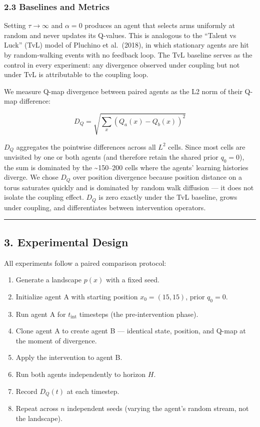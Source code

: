 \documentclass[
]{article}
\providecommand{\tightlist}{%
  \setlength{\itemsep}{0pt}\setlength{\parskip}{0pt}}
\begin{document}
\subsubsection{2.3 Baselines and Metrics}\label{baselines-and-metrics}

Setting \(\tau \to \infty\) and \(\alpha = 0\) produces an agent that
selects arms uniformly at random and never updates its Q-values. This is
analogous to the ``Talent vs Luck'' (TvL) model of Pluchino et
al.~(2018), in which stationary agents are hit by random-walking events
with no feedback loop. The TvL baseline serves as the control in every
experiment: any divergence observed under coupling but not under TvL is
attributable to the coupling loop.

We measure Q-map divergence between paired agents as the L2 norm of
their Q-map difference:

\[D_Q = \sqrt{\sum_{x} \left(Q_a(x) - Q_b(x)\right)^2}\]

\(D_Q\) aggregates the pointwise differences across all \(L^2\) cells.
Since most cells are unvisited by one or both agents (and therefore
retain the shared prior \(q_0 = 0\)), the sum is dominated by the
\textasciitilde150--200 cells where the agents' learning histories
diverge. We chose \(D_Q\) over position divergence because position
distance on a torus saturates quickly and is dominated by random walk
diffusion --- it does not isolate the coupling effect. \(D_Q\) is zero
exactly under the TvL baseline, grows under coupling, and differentiates
between intervention operators.

\begin{center}\rule{0.5\linewidth}{0.5pt}\end{center}

\subsection{3. Experimental Design}\label{experimental-design}

All experiments follow a paired comparison protocol:

\begin{enumerate}
\def\labelenumi{\arabic{enumi}.}
\tightlist
\item
  Generate a landscape \(p(x)\) with a fixed seed.
\item
  Initialize agent A with starting position \(x_0 = (15, 15)\), prior
  \(q_0 = 0\).
\item
  Run agent A for \(t_{\mathrm{int}}\) timesteps (the pre-intervention
  phase).
\item
  Clone agent A to create agent B --- identical state, position, and
  Q-map at the moment of divergence.
\item
  Apply the intervention to agent B.
\item
  Run both agents independently to horizon \(H\).
\item
  Record \(D_Q(t)\) at each timestep.
\item
  Repeat across \(n\) independent seeds (varying the agent's random
  stream, not the landscape).
\end{enumerate}
\end{document}
